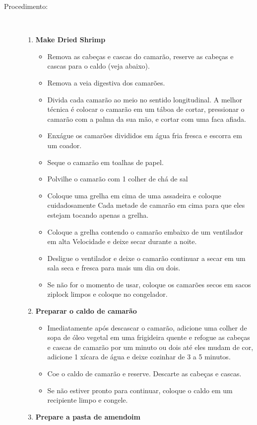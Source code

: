 \documentclass [11pt, letterpaper] {article}
\begin{document}
\begin {description}
\item [Procedimento:] \ \\
\begin {enumerate}
\item {\bf Make Dried Shrimp}
\begin {itemize}
\item Remova as cabeças e cascas do camarão, reserve as cabeças e cascas para o caldo (veja abaixo).
\item Remova a veia digestiva dos camar\~oes.
\item Divida cada camarão ao meio no sentido longitudinal. A melhor técnica é colocar o camarão em um
t\'aboa de cortar, pressionar o camar\~ao com a palma da sua mão,
e cortar com uma faca afiada.
\item Enxágue os camar\~oes divididos em água fria fresca e
escorra em um coador.
\item Seque o camarão em toalhas de papel.
\item Polvilhe o camarão com 1 colher de chá de sal
\item Coloque uma grelha em cima de uma assadeira e coloque cuidadosamente
Cada metade de camarão em cima para que eles estejam tocando apenas a grelha.
\item Coloque a grelha contendo o camarão embaixo de um ventilador em alta
Velocidade e deixe secar durante a noite.
\item Desligue o ventilador e deixe o camarão continuar a secar em um
sala seca e fresca para mais um dia ou dois.
\item Se não for o momento de usar, coloque os camar\~oes secos em sacos ziplock limpos e coloque
no congelador.
\end {itemize}
\item {\bf Preparar o caldo de camarão}
\begin {itemize}
\item Imediatamente após descascar o camarão, adicione uma
colher de sopa de óleo vegetal em uma frigideira quente e refogue as cabeças e cascas de camarão por um minuto ou dois até
eles mudam de cor, adicione 1 xícara de água e deixe cozinhar de
3 a 5 minutos.
\item Coe o caldo de camarão e reserve. Descarte as cabeças
e cascas.
\item Se não estiver pronto para continuar, coloque o caldo em um recipiente limpo 
e congele.
\end {itemize}
\item {\bf Prepare a pasta de amendoim}
\begin {itemize}

\end{itemize}
\end{enumerate}
\end{description}
\end{document}
